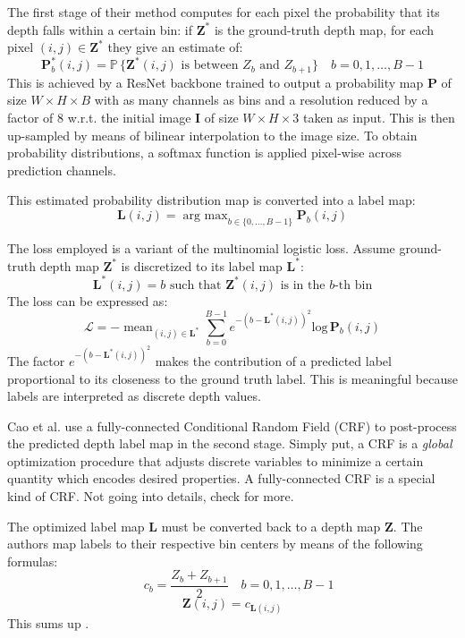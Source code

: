 The first stage of their method computes for each pixel the probability that its depth falls within a certain bin: if $\mathbf{Z}^{*}$ is the ground-truth depth map, for each pixel $(i, j) \in \mathbf{Z}^{*}$ they give an estimate of:
\[
	\mathbf{P}^{*}_{b}(i, j) = \mathbb{P} \, \{\mathbf{Z}^{*}(i, j) \text{ is between } Z_{b} \text{ and } Z_{b+1}\} \quad b = 0, 1, \dotsc, B-1
\]
This is achieved by a ResNet \cite{ResNet} backbone trained to output a probability map $\mathbf{P}$ of size $W \times H \times B$ with as many channels as bins and a resolution reduced by a factor of 8 w.r.t. the initial image $\mathbf{I}$ of size $W \times H \times 3$ taken as input.
This is then up-sampled by means of bilinear interpolation to the image size.
To obtain probability distributions, a softmax function is applied pixel-wise across prediction channels.

This estimated probability distribution map is converted into a label map:
\[
	\mathbf{L}(i, j) = \mathop{\text{arg max}}_{b \in \{ 0, \dotsc, B-1\}} \mathbf{P}_{b}(i, j)
\]

The loss employed is a variant of the multinomial logistic loss.
Assume ground-truth depth map $\mathbf{Z}^{*}$ is discretized to its label map $\mathbf{L}^{*}$:
\[
	\mathbf{L}^{*}(i, j) = b \text{ such that } \mathbf{Z}^{*}(i, j) \text{ is in the } b\text{-th bin}
\]
The loss can be expressed as:
\[
	\mathcal{L} =
		- \mathop{\text{mean}}_{(i, j) \in \mathbf{L}^{*}}
		\sum_{b = 0}^{B-1}
		e^{-(b - \mathbf{L}^{*}(i, j))^{2}}
		\text{log} \, \mathbf{P}_{b}(i, j)
\]
The factor $e^{-(b - \mathbf{L}^{*}(i, j))^{2}}$ makes the contribution of a predicted label proportional to its closeness to the ground truth label.
This is meaningful because labels are interpreted as discrete depth values.

Cao et al. use a fully-connected Conditional Random Field (CRF) to post-process the predicted depth label map in the second stage.
Simply put, a CRF is a \textit{global} optimization procedure that adjusts discrete variables to minimize a certain quantity which encodes desired properties.
A fully-connected CRF is a special kind of CRF.
Not going into details, check \cite{computer_vision} for more.

The optimized label map $\mathbf{L}$ must be converted back to a depth map $\mathbf{Z}$.
The authors map labels to their respective bin centers by means of the following formulas:
\[
	\quad c_{b} = \frac{Z_{b} + Z_{b+1}}{2} \quad b = 0, 1, \dotsc, B-1
\]\[
	\mathbf{Z}(i, j) = c_{\mathbf{L}(i, j)}
\]
This sums up \cite{depth_as_classification}.

